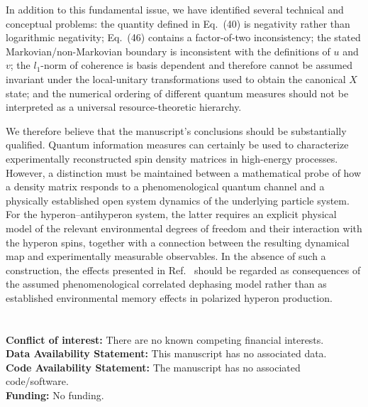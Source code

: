 \documentclass[epjc,twocolumn,nofootinbib,preprintnumbers,amsmath,amssymb]{revtex4-2}
\begin{document}
In addition to this fundamental issue, we have identified several technical and conceptual problems: the quantity defined in Eq.~(40) is negativity rather than logarithmic negativity; Eq.~(46) contains a factor-of-two inconsistency; the stated Markovian/non-Markovian boundary is inconsistent with the definitions of $u$ and $v$; the $l_1$-norm of coherence is basis dependent and therefore cannot be assumed invariant under the local-unitary transformations used to obtain the canonical $X$ state; and the numerical ordering of different quantum measures should not be interpreted as a universal resource-theoretic hierarchy.

We therefore believe that the manuscript's conclusions should be substantially qualified. Quantum information measures can certainly be used to characterize experimentally reconstructed spin density matrices in high-energy processes. However, a distinction must be maintained between a mathematical probe of how a density matrix responds to a phenomenological quantum channel and a physically established open system dynamics of the underlying particle system.
For the hyperon--antihyperon system, the latter requires an explicit physical model of the relevant environmental degrees of freedom and their interaction with the hyperon spins, together with a connection between the resulting dynamical map and experimentally measurable observables. In the absence of such a construction, the effects presented in Ref.~\cite{Bachain} should be regarded as consequences of the assumed phenomenological correlated dephasing model rather than as established environmental memory effects in polarized hyperon production.
\\
\\
\\
\textbf{Conflict of interest:}
There are no known competing financial interests.
\\
\textbf{Data Availability Statement:}
This manuscript has no associated data.
\\
\textbf{Code Availability Statement:}
The manuscript has no associated code/software.
\\
\textbf{Funding:}
No funding.
\end{document}
